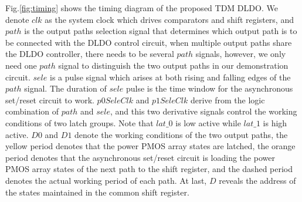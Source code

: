 \documentclass[journal]{IEEEtran}
\begin{document}
Fig.\ref{fig:timing} shows the timing diagram of the proposed TDM DLDO. We denote $clk$ as the system clock which drives comparators and shift registers, and $path$ is the output paths selection signal that determines which output path is to be connected with the DLDO control circuit, when multiple output paths share the DLDO controller, there needs to be several $path$ signals, however, we only need one $path$ signal to distinguish the two output paths in our demonstration circuit. $sele$ is a pulse signal which arises at both rising and falling edges of the $path$ signal. The duration of $sele$ pulse is the time window for the asynchronous set/reset circuit to work. $p0SeleClk$ and $p1SeleClk$ derive from the logic combination of $path$ and $sele$, and this two derivative signals control the working conditions of two latch groups. Note that $lat\_0$ is low active while $lat\_1$ is high active. $D0$ and $D1$ denote the working conditions of the two output paths, the yellow period denotes that the power PMOS array states are latched, the orange period denotes that the asynchronous set/reset circuit is loading the power PMOS array states of the next path to the shift register, and the dashed period denotes the actual working period of each path. At last, $D$ reveals the address of the states maintained in the common shift register.
\end{document}
